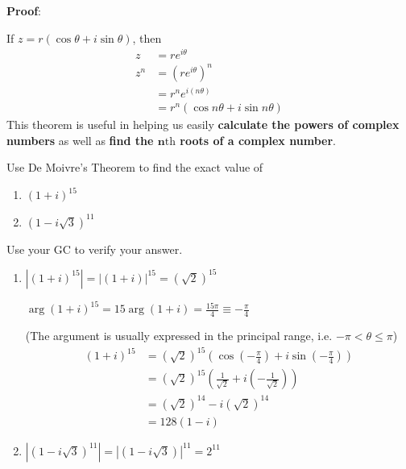 \documentclass[11pt,a4paper]{book}
\begin{document}
\textbf{Proof}:

If $z=r\left(\cos\theta+i\sin\theta\right)$, then
\begin{align*}
z & =re^{i\theta}\\
z^{n} & =\left(re^{i\theta}\right)^{n}\\
 & =r^{n}e^{i\left(n\theta\right)}\\
 & =r^{n}\left(\cos n\theta+i\sin n\theta\right)
\end{align*}
This theorem is useful in helping us easily \textbf{calculate the
powers of complex numbers} as well as \textbf{find the $\textbf{n}\text{th}$
roots of a complex number}.

\begin{example}

Use De Moivre's Theorem to find the exact value of

\begin{enumerate}[label=(\alph*)]

\item  $\left(1+i\right)^{15}$

\item  $\left(1-i\sqrt{3}\right)^{11}$

\end{enumerate}

Use your GC to verify your answer.

\Solution

\begin{enumerate}[label=(\alph*)]

\item  $\left|\left(1+i\right)^{15}\right|=\left|\left(1+i\right)\right|^{15}=\left(\sqrt{2}\right)^{15}$

${\displaystyle \arg\left(1+i\right)^{15}=15\arg\left(1+i\right)=\frac{15\pi}{4}\equiv-\frac{\pi}{4}}$

(The argument is usually expressed in the principal range, i.e. $-\pi<\theta\leq\pi$)
\begin{align*}
\left(1+i\right)^{15} & =\left(\sqrt{2}\right)^{15}\left(\cos\left(-\frac{\pi}{4}\right)+i\sin\left(-\frac{\pi}{4}\right)\right)\\
 & =\left(\sqrt{2}\right)^{15}\left(\frac{1}{\sqrt{2}}+i\left(-\frac{1}{\sqrt{2}}\right)\right)\\
 & =\left(\sqrt{2}\right)^{14}-i\left(\sqrt{2}\right)^{14}\\
 & =128\left(1-i\right)
\end{align*}

\item  $\left|\left(1-i\sqrt{3}\right)^{11}\right|=\left|\left(1-i\sqrt{3}\right)\right|^{11}=2^{11}$


\end{enumerate}
\end{example}
\end{document}

